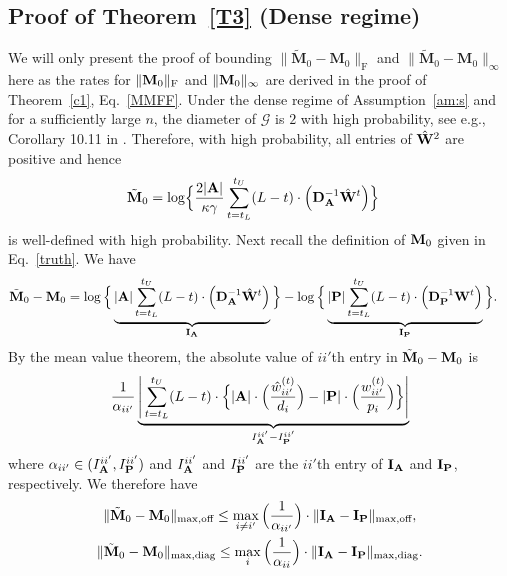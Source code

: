\documentclass[10pt,journal,compsoc]{IEEEtran}
\newcommand{\ee}{\end{aligned} \end{equation}}
\newcommand{\bee}{\begin{equation}\begin{aligned}}
\newcommand{\M}[1]{{{\mathbf{\MakeUppercase{#1}}}}}
\newcommand{\F}{\mathrm{F}}
\numberwithin{equation}{section}
\begin{document}
\subsection{Proof of Theorem~\ref{T3} (Dense regime)}
We will only present the proof of bounding $\|\tilde{\mathbf{M}}_0 -
\mathbf{M}_0 \|_{\F}$ and $\|\tilde{\mathbf{M}}_0 -
\mathbf{M}_0 \|_{\infty}$ here as the rates for $\|\M M_0\|_{\F}$ and $\|\M M_0\|_{\infty}$ are derived
in the proof of Theorem~\ref{c1}, Eq.~\eqref{MMFF}.
Under the dense regime of Assumption~\ref{am:s} and for a sufficiently
large $n$, the diameter of $\mathcal{G}$ is $2$ with high probability,
see e.g., Corollary 10.11 in \cite{bollobas2001random}. Therefore,
with high probability, all entries of $\hat{\M W}^2$ are
positive and hence
\bee\nonumber
\tilde{\mathbf{M}}_0 &= \log \Bigl\{\frac{2|\M A|}{\kappa \gamma}\sum_{t =
  t_L}^{t_U}(L - t)\cdot\Big(\M D_{\M A}^{-1}\hat{\M W}^t\Big)\Bigr\} 
\ee
is well-defined with high probability.
Next recall the definition of $\M M_0$ given in Eq.~\eqref{truth}. We
have
\bee\label{T7:df1}
\tilde{\M M}_0 - \M M_0 &= 
\log\Big\{\underbrace{{|\M A|}{}\sum_{t = t_L}^{t_U}(L - t)\cdot\Big(\M D_{\M A}^{-1}\hat{\M W}^t\Big)}_{\M I_{\M A}}\Big\} 
- \log\Big\{\underbrace{{|\M P|}{}\sum_{t = t_L}^{t_U}(L - t)\cdot\Big(\M D_{\M P}^{-1}{\M W}^t\Big)}_{\M I_{\M P}}\Big\}.
\ee
By the mean value theorem, the absolute value of $ii'$th entry in $\tilde{\M M}_0 - \M M_0$ is 
\bee\nonumber
\frac{1}{\alpha_{ii'}}\underbrace{\Bigg|\sum_{t = t_L}^{t_U}(L -
  t)\cdot\Big\{|\M A|
  \cdot\Big(\frac{\hat{w}_{ii'}^{(t)}}{d_i}\Big)-|\M P| \cdot\Big(\frac{{w}_{ii'}^{(t)}}{p_i}\Big)\Big\}\Bigg|}_{I^{ii'}_{\M A} - I^{ii'}_{\M P}}
\ee
where $\alpha_{ii'}\in (I^{ii'}_{\M A},I ^{ii'}_{\M P})$ and $I^{ii'}_{\M A}$
and $I^{ii'}_{\M P}$ are the $ii'$th entry of $\M I_{\M A}$ and $\M
I_{\M P}$, respectively. We therefore have
\begin{gather*}
\|\tilde{\M M}_0 - \M M_0\|_{\max,\text{off}} \leq\max_{i \not =
  i'}\Big(\frac{1}{\alpha_{ii'}}\Big)\cdot \|\M I_{\M A} - \M I_{\M
  P}\|_{\max,\text{off}}, \\
\|\tilde{\M M}_0 - \M M_0\|_{\max,\text{diag}} \leq\max_{i}\Big(\frac{1}{\alpha_{ii}}\Big)\cdot \|\M I_{\M A} - \M I_{\M P}\|_{\max,\text{diag}}.
\end{gather*}
\end{document}
